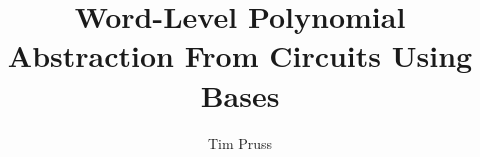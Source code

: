 \documentclass[xcolor=dvipsnames]{beamer}
\title[GF Abstraction using \Grobner Bases]{Word-Level Polynomial Abstraction From Circuits Using \Grobner Bases}
\author[Tim Pruss]{Tim Pruss}
\institute[Univ. of Utah]{
Graduate Student\\
Electrical and Computer Engineering, University of Utah\\
pruss.tim@gmail.com\\
\ \\
\ \\
{\bf Master's Thesis Proposal}\\
}
\date{}
\begin{document}
\begin{frame}[plain]
  \titlepage

\end{frame}







\end{document}
